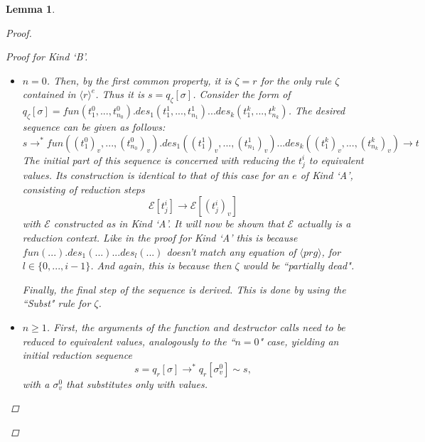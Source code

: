 \documentclass[11pt]{article} %
\newtheorem{lemma}{Lemma}
\begin{document}
\begin{lemma}
\begin{proof}
\begin{enumerate}
\begin{proof}[Proof for Kind `B']
\begin{itemize}
\item $n = 0$. Then, by the first common property, it is $\zeta = r$ for the only rule $\zeta$ contained in $\langle r \rangle^e$. Thus it is $s = q_\zeta[\sigma]$. Consider the form of $q_\zeta[\sigma] = fun(t^0_1, ..., t^0_{n_0}).des_1(t^1_1, ..., t^1_{n_1})...des_k(t^k_1, ..., t^k_{n_k})$. The desired sequence can be given as follows:
\begin{equation*}
s \longrightarrow^* fun((t^0_1)_v, ..., (t^0_{n_0})_v).des_1((t^1_1)_v, ..., (t^1_{n_1})_v)...des_k((t^k_1)_v, ..., (t^k_{n_k})_v) \longrightarrow t
\end{equation*}
The initial part of this sequence is concerned with reducing the $t^i_j$ to equivalent values. Its construction is identical to that of this case for an $e$ of Kind `A', consisting of reduction steps
\begin{equation*}
\mathcal{E}[t^i_j] \longrightarrow \mathcal{E}[(t^i_j)_v]
\end{equation*}
with $\mathcal{E}$ constructed as in Kind `A'. It will now be shown that $\mathcal{E}$ actually is a reduction context. Like in the proof for Kind `A' this is because $fun(...).des_1(...)...des_l(...)$ doesn't match any equation of $\langle prg \rangle$, for $l \in \{0, ..., i-1\}$. And again, this is because then $\zeta$ would be ``partially dead".

Finally, the final step of the sequence is derived. This is done by using the ``Subst" rule for $\zeta$.

\item $n \geq 1$. First, the arguments of the function and destructor calls need to be reduced to equivalent values, analogously to the ``$n = 0$" case, yielding an initial reduction sequence
\begin{equation*}
s = q_r[\sigma] \longrightarrow^* q_r[\sigma^0_v] \sim s,
\end{equation*}
with a $\sigma^0_v$ that substitutes only with values.


\end{itemize}
\end{proof}
\end{enumerate}
\end{proof}
\end{lemma}
\end{document}
